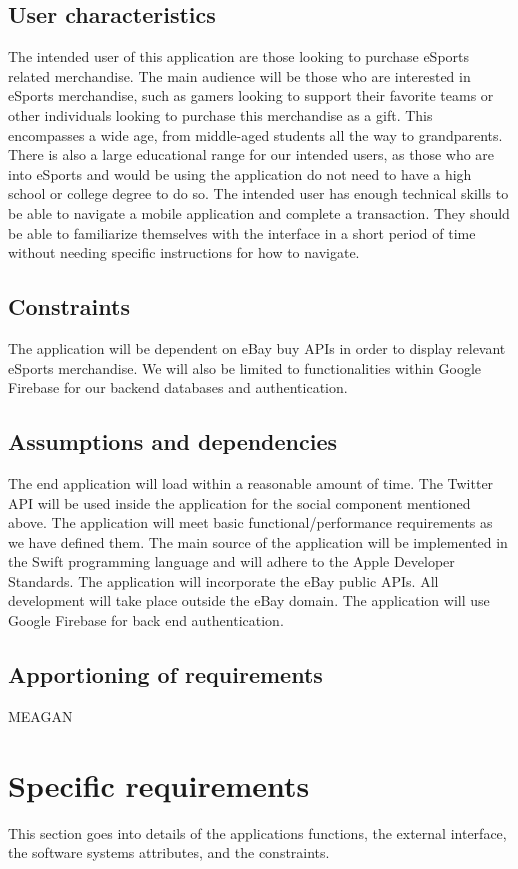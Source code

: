 \documentclass[onecolumn, draftclsnofoot,10pt, compsoc]{IEEEtran}
\begin{document}
\subsection{User characteristics}
The intended user of this application are those looking to purchase eSports related merchandise. The main audience will be those who are interested in eSports merchandise, such as gamers looking to support their favorite teams or other individuals looking to purchase this merchandise as a gift. This encompasses a wide age, from middle-aged students all the way to grandparents. There is also a large educational range for our intended users, as those who are into eSports and would be using the application do not need to have a high school or college degree to do so. The intended user has enough technical skills to be able to navigate a mobile application and complete a transaction. They should be able to familiarize themselves with the interface in a short period of time without needing specific instructions for how to navigate.

\subsection{Constraints}
The application will be dependent on eBay buy APIs in order to display relevant eSports merchandise. We will also be limited to functionalities within Google Firebase for our backend databases and authentication. 

\subsection{Assumptions and dependencies}
The end application will load within a reasonable amount of time. The Twitter API will be used inside the application for the social component mentioned above. The application will meet basic functional/performance requirements as we have defined them. The main source of the application will be implemented in the Swift programming language and will adhere to the Apple Developer Standards. The application will incorporate the eBay public APIs. All development will take place outside the eBay domain. The application will use Google Firebase for back end authentication. 

\subsection{Apportioning of requirements}
MEAGAN

\section{Specific requirements}
This section goes into details of the applications functions, the external interface, the software systems attributes, and the constraints.
\end{document}
